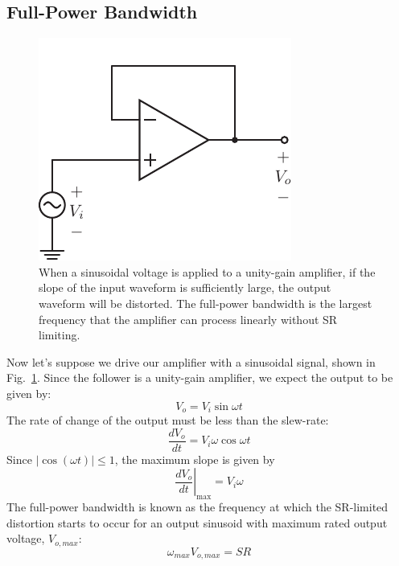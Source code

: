 \subsection{Full-Power Bandwidth}
\begin{figure}[tb]
\centering
\includegraphics[scale=1]{opamp_unitygain}
\caption{When a sinusoidal voltage is applied to a unity-gain amplifier, if the slope of the input waveform is sufficiently large, the output waveform will be distorted.  The full-power bandwidth is the largest frequency that the amplifier can process linearly without SR limiting.}
\label{fig:opamp_unitygain_fig}
\end{figure}
Now let's suppose we drive our amplifier with a sinusoidal signal, shown in Fig.~\ref{fig:opamp_unitygain_fig}.  Since the follower is a  unity-gain amplifier, we expect the output to be given by:
    \begin{equation} 
        V_o = V_i \sin\omega t 
    \end{equation}
The rate of change of the output must be less than the slew-rate:
    \begin{equation}
        \frac{dV_o}{dt} = V_i \omega \cos\omega t 
    \end{equation}
Since $|\cos(\omega t)| \le 1$, the maximum slope is given by
    \begin{equation}
        \left. \frac{dV_o}{dt} \right|_{\text{max}} = V_i \omega 
    \end{equation}
The full-power bandwidth is known as the frequency at which the SR-limited distortion starts to occur for an output sinusoid with maximum rated output voltage, $V_{o,max}$:
    \begin{equation}
        \omega_{max} V_{o,max} = SR
    \end{equation} 
